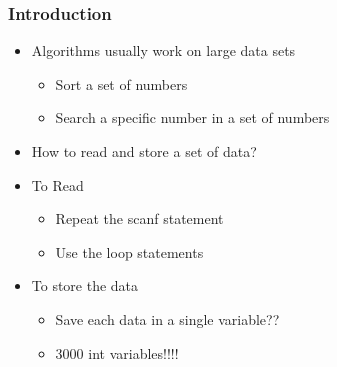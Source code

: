 \documentclass{../c-lecture}
\begin{document}
\begin{frame}
  \frametitle{Introduction}
  \begin{itemize}
    \item Algorithms usually work on large data sets
    \begin{itemize}
      \item Sort a set of numbers
      \item Search a specific number in a set of numbers
    \end{itemize}
    \item How to read and store a set of data?
    \item To Read
    \begin{itemize}
      \item Repeat the scanf statement
      \item Use the loop statements
    \end{itemize}
    \item To store the data
    \begin{itemize}
      \item Save each data in a single variable??
      \item 3000 int variables!!!!
    \end{itemize}
  \end{itemize}
\end{frame}
\end{document}
